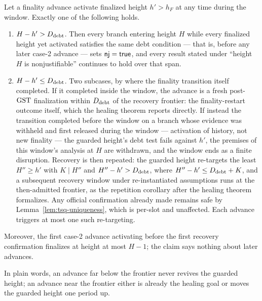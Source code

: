 \begin{lemma}
\label{lem:debt-dichotomy}
Let a finality advance activate finalized height \(h'>h_F\) at any time
during the window.  Exactly one
of the following holds.
\begin{enumerate}
 \item \(H-h'>D_{\rm debt}\).  Then every branch entering height \(H\)
   while every finalized height yet activated satisfies the same debt
   condition --- that is, before any later case-2 advance --- sets
   \(\mathsf{nj}=\mathsf{true}\), and every
   result stated under ``height \(H\) is nonjustifiable'' continues to
   hold over that span.
 \item \(H-h'\leq D_{\rm debt}\).  Two subcases, by where the
   finality transition itself completed.  If it completed inside the
   window, the advance is a fresh post-\(\mathrm{GST}\) finalization within
   \(D_{\rm debt}\) of the recovery frontier: the finality-restart
   outcome itself, which the healing theorem reports directly.  If
   instead the transition completed before the window on a branch whose
   evidence was withheld and first released during the window ---
   activation of history, not new finality --- the guarded height's debt
   test fails against \(h'\), the premises of this window's analysis at
   \(H\) are withdrawn, and the window ends as a finite disruption.
   Recovery is then repeated: the guarded height re-targets the least
   \(H''\geq h'\) with \(K\mid H''\) and \(H''-h'>D_{\rm debt}\), where
   \(H''-h'\leq D_{\rm debt}+K\), and a subsequent recovery window under
   re-instantiated assumptions runs at the then-admitted frontier, as
   the repetition corollary after the healing theorem formalizes.  Any
   official confirmation already made remains safe by
   Lemma~\ref{lem:tsq-uniqueness}, which is per-slot and unaffected.
   Each advance triggers at most one such re-targeting.
\end{enumerate}
Moreover, the first case-2 advance activating before the first
recovery confirmation finalizes at height at most
\(H-1\); the claim says nothing about later advances.

In plain words, an advance far below the frontier never revives the
guarded height; an advance near the frontier either is already the
healing goal or moves the guarded height one period up.
\end{lemma}

